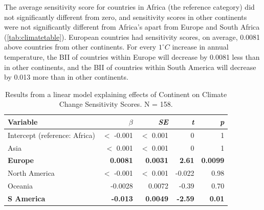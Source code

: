 \documentclass[11pt, a4paper, titlepage]{article}
\begin{document}
	The average sensitivity score for countries in Africa (the reference category) did not significantly different from zero, and sensitivity scores in other continents were not significantly different from Africa's apart from Europe and South Africa (\autoref{tab:climatetable}). European countries had sensitivity scores, on average, 0.0081 above countries from other continents. For every $1^\circ C$ increase in annual temperature, the BII of countries within Europe will decrease by 0.0081 less than in other continents, and the BII of countries within South America will decrease by 0.013 more than in other continents. 
	
	
	
	\newpage
	
	\begin{table}[h!]
		\begin{center}
			\caption{Results from a linear model explaining effects of Continent on Climate Change Sensitivity Scores. \textmd{N = 158.}}
			\label{tab:climatetable}
			\begin{tabular}{l|r|r|r|r} %
				Variable & $\beta$ & \textit{SE} & \textit{t} & \textit{p}\\
				\hline
				Intercept (reference: Africa) & $<$ -0.001 & $<$ 0.001 & 0 & 1\\
				Asia & $<$ 0.001 & $<$ 0.001& 0 & 1\\
				\textbf{Europe} & \textbf{0.0081} & \textbf{0.0031} & \textbf{2.61} & \textbf{0.0099} \\
				North America & $<$ -0.001 & $<$ 0.001 & -0.022 & 0.98\\
				Oceania & -0.0028 & 0.0072 & -0.39 & 0.70\\
				\textbf{S America} & \textbf{-0.013} & \textbf{0.0049} & \textbf{-2.59} & \textbf{0.01}\\
			\end{tabular}
		\end{center}
	\end{table}
	
\end{document}

